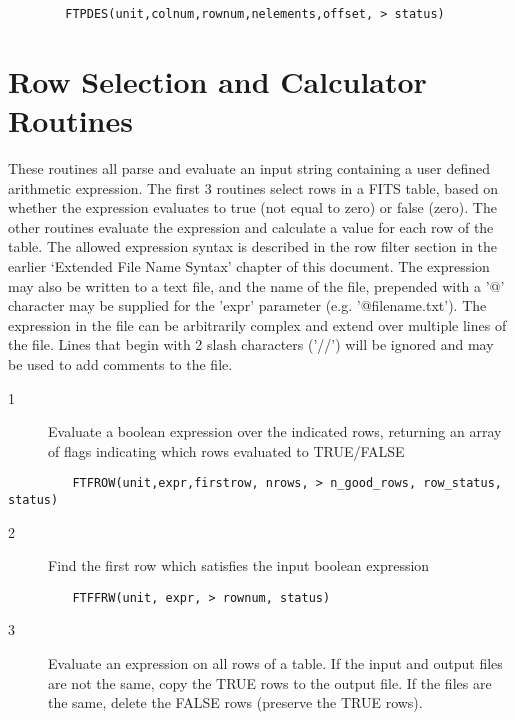 \documentclass[11pt]{book}
\begin{document}
\begin{verbatim}
        FTPDES(unit,colnum,rownum,nelements,offset, > status)
\end{verbatim}


\section{Row Selection and Calculator Routines \label{FTFROW}}

These routines all parse and evaluate an input string containing a user
defined arithmetic expression.  The first 3 routines select rows in a
FITS table, based on whether the expression evaluates to true (not
equal to zero) or false (zero).  The other routines evaluate the
expression and calculate a value for each row of the table.  The
allowed expression syntax is described in the row filter section in the
earlier `Extended File Name Syntax' chapter of this document.  The
expression may also be written to a text file, and the name of the
file, prepended with a '@' character may be supplied for the 'expr'
parameter (e.g.  '@filename.txt'). The  expression  in  the  file can
be arbitrarily complex and extend over multiple lines of the file.
Lines  that begin with 2 slash characters ('//') will  be ignored and
may be used to add comments to the file.


\begin{description}
\item[1 ] Evaluate a boolean expression over the indicated rows, returning an
 array of flags indicating which rows evaluated to TRUE/FALSE
\end{description}

\begin{verbatim}
         FTFROW(unit,expr,firstrow, nrows, > n_good_rows, row_status, status)
\end{verbatim}

\begin{description}
\item[2 ] Find the first row which satisfies the input boolean expression
\end{description}

\begin{verbatim}
         FTFFRW(unit, expr, > rownum, status)
\end{verbatim}

\begin{description}
\item[3 ]Evaluate an expression on all rows of a table.  If the input and output
files are not the same, copy the TRUE rows to the output file.  If the
files are the same, delete the FALSE rows (preserve the TRUE rows).
\end{description}
\end{document}
